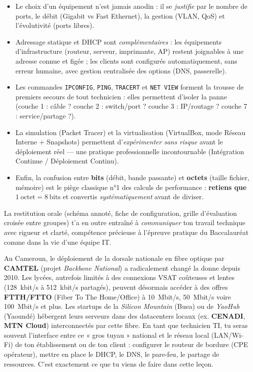 \documentclass[11pt]{article}
\begin{document}
\begin{itemize}
\item Le choix d'un équipement n'est jamais anodin : il se \emph{justifie} par le nombre de ports, le débit (Gigabit vs Fast Ethernet), la gestion (VLAN, QoS) et l'évolutivité (ports libres).
\item Adressage statique et DHCP sont \emph{complémentaires} : les équipements d'infrastructure (routeur, serveur, imprimante, AP) restent joignables à une adresse connue et figée ; les clients sont configurés automatiquement, sans erreur humaine, avec gestion centralisée des options (DNS, passerelle).
\item Les commandes \texttt{IPCONFIG}, \texttt{PING}, \texttt{TRACERT} et \texttt{NET VIEW} forment la trousse de premiers secours de tout technicien : elles permettent d'isoler la panne (couche 1 : câble ? couche 2 : switch/port ? couche 3 : IP/routage ? couche 7 : service/partage ?).
\item La simulation (Packet Tracer) et la virtualisation (VirtualBox, mode Réseau Interne + Snapshots) permettent d'\emph{expérimenter sans risque} avant le déploiement réel — une pratique professionnelle incontournable (Intégration Continue / Déploiement Continu).
\item Enfin, la confusion entre \textbf{bits} (débit, bande passante) et \textbf{octets} (taille fichier, mémoire) est le piège classique n°1 des calculs de performance : \textbf{retiens que $1~\text{octet} = 8~\text{bits}$} et convertis \emph{systématiquement} avant de diviser.
\end{itemize}

La restitution orale (schéma annoté, fiche de configuration, grille d'évaluation croisée entre groupes) t'a en outre entraîné à \emph{communiquer} ton travail technique avec rigueur et clarté, compétence précieuse à l'épreuve pratique du Baccalauréat comme dans la vie d'une équipe IT.

\begin{savaistu}
Au Cameroun, le déploiement de la dorsale nationale en fibre optique par \textbf{CAMTEL} (projet \emph{Backbone National}) a radicalement changé la donne depuis 2010. Les lycées, autrefois limités à des connexions VSAT coûteuses et lentes (\SI{128}{kbit/s} à \SI{512}{kbit/s} partagés), peuvent désormais accéder à des offres \textbf{FTTH/FTTO} (Fiber To The Home/Office) à \SI{10}{Mbit/s}, \SI{50}{Mbit/s} voire \SI{100}{Mbit/s} et plus.
Les startups de la \emph{Silicon Mountain} (Buea) ou de \emph{YaoHub} (Yaoundé) hébergent leurs serveurs dans des datacenters locaux (ex. \textbf{CENADI}, \textbf{MTN Cloud}) interconnectés par cette fibre. En tant que technicien TI, tu seras souvent l'interface entre ce « gros tuyau » national et le réseau local (LAN/Wi-Fi) de ton établissement ou de ton client : configurer le routeur de bordure (CPE opérateur), mettre en place le DHCP, le DNS, le pare-feu, le partage de ressources. C'est exactement ce que tu viens de faire dans cette leçon.
\end{savaistu}
\end{document}
